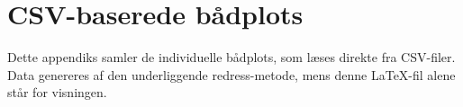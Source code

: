 \appendix
\clearpage
\newpage
\section{CSV-baserede bådplots}
Dette appendiks samler de individuelle bådplots, som læses direkte fra CSV-filer.
Data genereres af den underliggende redress-metode, mens denne LaTeX-fil alene står for visningen.



